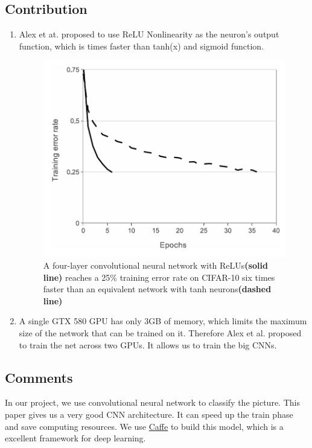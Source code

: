 \documentclass[a4paper]{article}
\begin{document}
      \subsection{Contribution}
      
      \begin{enumerate}
          \item Alex et at. proposed to use ReLU Nonlinearity as the neuron's output function, which is times faster than tanh(x) and sigmoid function.
          \begin{figure}[h]
          \centering
          \includegraphics[width=0.7\linewidth]{screenshot001}
          \caption{A four-layer convolutional neural network with ReLUs\textbf{(solid line)} reaches a 25\% training error rate on CIFAR-10 six times faster than an equivalent network with tanh neurons\textbf{(dashed line)}}
          \label{fig:screenshot001}
          \end{figure}

          \item A single GTX 580 GPU has only 3GB of memory, which limits the maximum size of the network that can be trained on it. Therefore Alex et al. proposed to train the net across two GPUs. It allows us to train the big CNNs.
      \end{enumerate}
      
      \subsection{Comments}
      In our project, we use convolutional neural network to classify the picture. This paper gives us a very good CNN architecture. It can speed up the train phase and save computing resources. We use \href{http://caffe.berkeleyvision.org/}{Caffe} to build this model, which is a excellent framework for deep learning.
\end{document}
